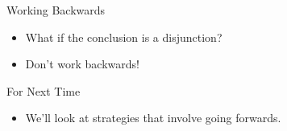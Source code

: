 \documentclass[
  ignorenonframetext,
]{beamer}
\providecommand{\tightlist}{%
  \setlength{\itemsep}{0pt}\setlength{\parskip}{0pt}}
\renewcommand{\,}{\text{, }}
\begin{document}
\begin{frame}{Working Backwards}
\protect\hypertarget{working-backwards}{}
\begin{itemize}
\tightlist
\item
  What if the conclusion is a disjunction?
\item
  Don't work backwards!
\end{itemize}
\end{frame}

\begin{frame}{For Next Time}
\protect\hypertarget{for-next-time}{}
\begin{itemize}
\tightlist
\item
  We'll look at strategies that involve going forwards.
\end{itemize}
\end{frame}
\end{document}
